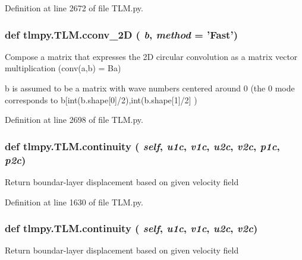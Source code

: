 Definition at line 2672 of file TLM.py.\hypertarget{namespacetlmpy_1_1TLM_a9fcc8c8a811ceb37ec01274b0e207e1f}{
\subsubsection[{cconv\_\-2D}]{\setlength{\rightskip}{0pt plus 5cm}def tlmpy.TLM.cconv\_\-2D ( {\em b}, \/   {\em method} = {\ttfamily 'Fast'})}}
\label{namespacetlmpy_1_1TLM_a9fcc8c8a811ceb37ec01274b0e207e1f}
\begin{DoxyVerb}
Compose a matrix that expresses the 2D circular convolution
as a matrix vector multiplication (conv(a,b) = Ba)

b is assumed to be a matrix with wave numbers centered around 0
(the 0 mode corresponds to b[int(b.shape[0]/2),int(b.shape[1]/2] )
\end{DoxyVerb}
 

Definition at line 2698 of file TLM.py.\hypertarget{namespacetlmpy_1_1TLM_a49c209ea1c1d71e77068211c166097e4}{
\subsubsection[{continuity}]{\setlength{\rightskip}{0pt plus 5cm}def tlmpy.TLM.continuity ( {\em self}, \/   {\em u1c}, \/   {\em v1c}, \/   {\em u2c}, \/   {\em v2c}, \/   {\em p1c}, \/   {\em p2c})}}
\label{namespacetlmpy_1_1TLM_a49c209ea1c1d71e77068211c166097e4}
\begin{DoxyVerb}Return boundar-layer displacement based on given velocity field\end{DoxyVerb}
 

Definition at line 1630 of file TLM.py.\hypertarget{namespacetlmpy_1_1TLM_a49c209ea1c1d71e77068211c166097e4}{
\subsubsection[{continuity}]{\setlength{\rightskip}{0pt plus 5cm}def tlmpy.TLM.continuity ( {\em self}, \/   {\em u1c}, \/   {\em v1c}, \/   {\em u2c}, \/   {\em v2c})}}
\label{namespacetlmpy_1_1TLM_a49c209ea1c1d71e77068211c166097e4}
\begin{DoxyVerb}Return boundar-layer displacement based on given velocity field\end{DoxyVerb}
 


